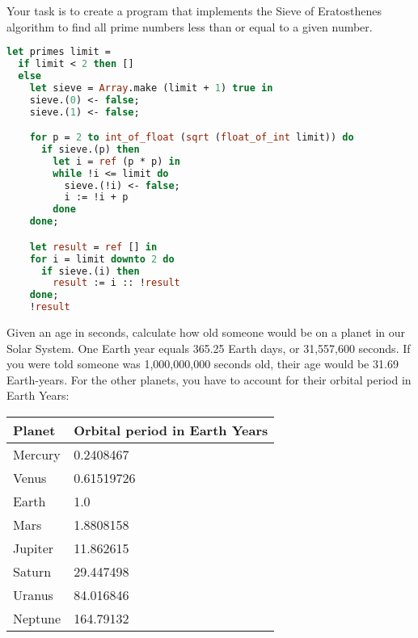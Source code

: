 Your task is to create a program that implements the Sieve of Eratosthenes algorithm to find all prime numbers less than or equal to a given number.

\begin{lstlisting}[language=OCaml]
let primes limit =
  if limit < 2 then []
  else
    let sieve = Array.make (limit + 1) true in
    sieve.(0) <- false;
    sieve.(1) <- false;

    for p = 2 to int_of_float (sqrt (float_of_int limit)) do
      if sieve.(p) then
        let i = ref (p * p) in
        while !i <= limit do
          sieve.(!i) <- false;
          i := !i + p
        done
    done;

    let result = ref [] in
    for i = limit downto 2 do
      if sieve.(i) then
        result := i :: !result
    done;
    !result
\end{lstlisting}

Given an age in seconds, calculate how old someone would be on a planet in our Solar System.
One Earth year equals 365.25 Earth days, or 31,557,600 seconds.
If you were told someone was 1,000,000,000 seconds old, their age would be 31.69 Earth-years.
For the other planets, you have to account for their orbital period in Earth Years:

\begin{center}
  \begin{tabular}{l|l}
    Planet  & Orbital period in Earth Years \\
    \hline
    Mercury & 0.2408467                     \\
    Venus   & 0.61519726                    \\
    Earth   & 1.0                           \\
    Mars    & 1.8808158                     \\
    Jupiter & 11.862615                     \\
    Saturn  & 29.447498                     \\
    Uranus  & 84.016846                     \\
    Neptune & 164.79132                     \\
  \end{tabular}
\end{center}


